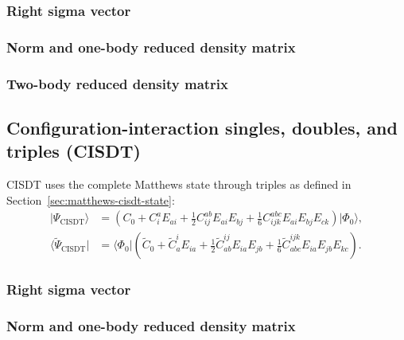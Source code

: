 \documentclass[10pt]{article}
\numberwithin{equation}{section}
\newcommand{\vac}{\Phi_0}
\begin{document}
\subsubsection{Right sigma vector}
\begingroup
\scriptsize
\setlength{\jot}{1pt}

\endgroup

\subsubsection{Norm and one-body reduced density matrix}
\begingroup
\scriptsize
\setlength{\jot}{1pt}

\endgroup

\subsubsection{Two-body reduced density matrix}
\begingroup
\scriptsize
\setlength{\jot}{1pt}

\endgroup

\clearpage
\subsection{Configuration-interaction singles, doubles, and triples (CISDT)}

CISDT uses the complete Matthews state through triples as defined in
Section~\ref{sec:matthews-cisdt-state}:
\begin{align}
 \lvert\Psi_{\mathrm{CISDT}}\rangle
 &=\left(
 C_0+C_i^aE_{ai}
 +\frac12C_{ij}^{ab}E_{ai}E_{bj}
 +\frac16C_{ijk}^{abc}E_{ai}E_{bj}E_{ck}
 \right)\lvert\vac\rangle,
 \\
 \langle\widetilde\Psi_{\mathrm{CISDT}}\rvert
 &=\langle\vac\rvert\left(
 \widetilde C_0+\widetilde C_a^iE_{ia}
 +\frac12\widetilde C_{ab}^{ij}E_{ia}E_{jb}
 +\frac16\widetilde C_{abc}^{ijk}E_{ia}E_{jb}E_{kc}
 \right).
\end{align}

\subsubsection{Right sigma vector}
\begingroup
\scriptsize
\setlength{\jot}{1pt}

\endgroup

\subsubsection{Norm and one-body reduced density matrix}
\begingroup
\scriptsize
\setlength{\jot}{1pt}

\endgroup
\end{document}
